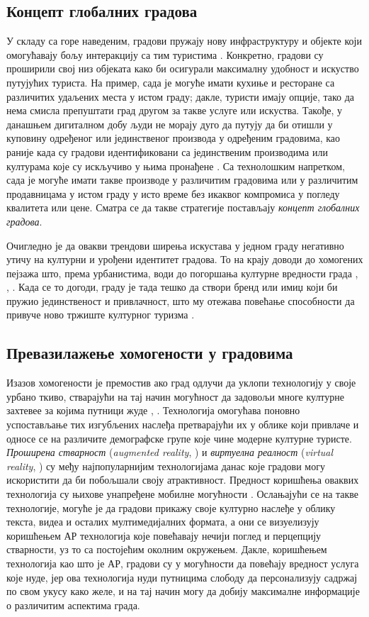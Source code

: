 \documentclass{article}
\begin{document}
\subsection{Концепт глобалних градова}
У складу са горе наведеним, градови пружају нову инфраструктуру и објекте који омогућавају бољу интеракцију са тим туристима \cite{postma}. Конкретно, градови су проширили свој низ објеката како би осигурали максималну удобност и искуство путујућих туриста. На пример, сада је могуће имати кухиње и ресторане са различитих удаљених места у истом граду; дакле, туристи имају опције, тако да нема смисла препуштати град другом за такве услуге или искуства. Такође, у данашњем дигиталном добу људи не морају дуго да путују да би отишли у куповину одређеног или јединственог производа у одређеним градовима, као раније када су градови идентификовани са јединственим производима или културама које су искључиво у њима пронађене \cite{zukins}. Са технолошким напретком, сада је могуће имати такве производе у различитим градовима или у различитим продавницама у истом граду у исто време без икаквог компромиса у погледу квалитета или цене. Сматра се да такве стратегије постављају \textit{концепт глобалних градова}.

Очигледно је да овакви трендови ширења искустава у једном граду негативно утичу на културни и урођени идентитет градова. То на крају доводи до хомогених пејзажа што, према урбанистима, води до погоршања културне вредности града \cite{jacobsj}, \cite{alexanderc}, \cite{seamond}. Када се то догоди, граду је тада тешко да створи бренд или имиџ који би пружио јединственост и привлачност, што му отежава повећање способности да привуче ново тржиште културног туризма \cite{hocaoglu}.

\subsection{Превазилажење хомогености у градовима}
Изазов хомогености је премостив ако град одлучи да уклопи технологију у своје урбано ткиво, стварајући на тај начин могућност да задовољи многе културне захтевее за којима путници жуде \cite{allamz1}, \cite{allamz2}. Технологија омогућава поновно успостављање тих изгубљених наслеђа претварајући их у облике који привлаче и односе се на различите демографске групе које чине модерне културне туристе. \textit{Проширена стварност} (\textit{augmented reality}, \cite{ar}) и \textit{виртуелна реалност} (\textit{virtual reality}, \cite{vr}) су међу најпопуларнијим технологијама данас које градови могу искористити да би побољшали своју атрактивност. Предност коришћења оваквих технологија су њихове унапређене мобилне могућности \cite{jungtchungn}. Ослањајући се на такве технологије, могуће је да градови прикажу своје културно наслеђе у облику текста, видеа и осталих мултимедијалних формата, а они се визуелизују коришћењем АР технологија које повећавају нечији поглед и перцепцију стварности, уз то са постојећим околним окружењем. Дакле, коришћењем технологија као што је АР, градови су у могућности да повећају вредност услуга које нуде, јер ова технологија нуди путницима слободу да персонализују садржај по свом укусу како желе, и на тај начин могу да добију максималне информације о различитим аспектима града.
\end{document}
